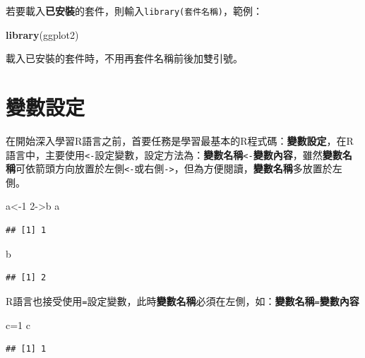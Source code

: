 \documentclass[]{book}
\newenvironment{Shaded}{\begin{snugshade}}{\end{snugshade}}
\newcommand{\KeywordTok}[1]{\textcolor[rgb]{0.13,0.29,0.53}{\textbf{{#1}}}}
\newcommand{\DecValTok}[1]{\textcolor[rgb]{0.00,0.00,0.81}{{#1}}}
\newcommand{\NormalTok}[1]{{#1}}
\theoremstyle{definition}
\theoremstyle{definition}
\theoremstyle{remark}
\begin{document}
若要載入\textbf{已安裝}的套件，則輸入\texttt{library(套件名稱)}，範例：

\begin{Shaded}
\begin{Highlighting}[]
\KeywordTok{library}\NormalTok{(ggplot2)}
\end{Highlighting}
\end{Shaded}

載入已安裝的套件時，不用再套件名稱前後加雙引號。

\section{變數設定}

在開始深入學習R語言之前，首要任務是學習最基本的R程式碼：\textbf{變數設定}，在R語言中，主要使用\texttt{\textless{}-}設定變數，設定方法為：\textbf{變數名稱}\texttt{\textless{}-}\textbf{變數內容}，雖然\textbf{變數名稱}可依箭頭方向放置於左側\texttt{\textless{}-}或右側\texttt{-\textgreater{}}，但為方便閱讀，\textbf{變數名稱}多放置於左側。

\begin{Shaded}
\begin{Highlighting}[]
\NormalTok{a<-}\DecValTok{1} 
\DecValTok{2}\NormalTok{->b}
\NormalTok{a}
\end{Highlighting}
\end{Shaded}

\begin{verbatim}
## [1] 1
\end{verbatim}

\begin{Shaded}
\begin{Highlighting}[]
\NormalTok{b}
\end{Highlighting}
\end{Shaded}

\begin{verbatim}
## [1] 2
\end{verbatim}

R語言也接受使用\texttt{=}設定變數，此時\textbf{變數名稱}必須在左側，如：\textbf{變數名稱}\texttt{=}\textbf{變數內容}

\begin{Shaded}
\begin{Highlighting}[]
\NormalTok{c=}\DecValTok{1} 
\NormalTok{c}
\end{Highlighting}
\end{Shaded}

\begin{verbatim}
## [1] 1
\end{verbatim}
\end{document}
